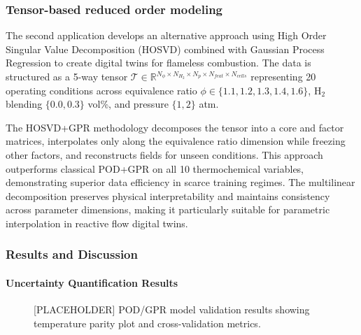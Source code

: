 \subsubsection*{Tensor-based reduced order modeling}

The second application develops an alternative approach using High Order Singular Value Decomposition (HOSVD) combined with Gaussian Process Regression to create digital twins for flameless combustion. The data is structured as a 5-way tensor $\mathcal{T} \in \mathbb{R}^{N_\phi \times N_{H_2} \times N_p \times N_{feat} \times N_{cells}}$ representing 20 operating conditions across equivalence ratio $\phi \in \{1.1, 1.2, 1.3, 1.4, 1.6\}$, H$_2$ blending $\{0.0, 0.3\}$ vol\%, and pressure $\{1, 2\}$ atm.

The HOSVD+GPR methodology decomposes the tensor into a core and factor matrices, interpolates only along the equivalence ratio dimension while freezing other factors, and reconstructs fields for unseen conditions. This approach outperforms classical POD+GPR on all 10 thermochemical variables, demonstrating superior data efficiency in scarce training regimes. The multilinear decomposition preserves physical interpretability and maintains consistency across parameter dimensions, making it particularly suitable for parametric interpolation in reactive flow digital twins.

\subsubsection*{Results and Discussion}

\paragraph{Uncertainty Quantification Results}


\FloatBarrier
\begin{figure}[htbp]
    \centering
    \caption{[PLACEHOLDER] POD/GPR model validation results showing temperature parity plot and cross-validation metrics.}
    \label{fig:ulb_pod_validation}
\end{figure}
\FloatBarrier


